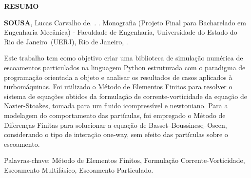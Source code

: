 \begin{center}
\textbf{RESUMO}
\end{center}

%
%

$\!$\\

\hspace{-1.3cm}\textbf{SOUSA}, Lucas Carvalho de. \textit{\mainTitle}. \numPages. Monografia (Projeto Final para Bacharelado em Engenharia Mecânica) - Faculdade de Engenharia, Universidade do Estado do Rio de Janeiro~(UERJ), Rio de Janeiro, \curYear.

\vspace{.2cm}

Este trabalho tem como objetivo criar uma biblioteca de simulação numérica de escoamentos particulados na linguagem Python estruturada com o paradigma de programação orientada a objeto e analisar os resultados de casos aplicados à  turbomáquinas.
Foi utilizado o Método de Elementos Finitos para resolver o sistema de equações obtidos da formulação de corrente-vorticidade da equação de Navier-Stoakes, tomada para um fluido icompressível e newtoniano.
Para a modelagem do comportamento das partículas, foi empregado o Método de Diferenças Finitas para solucionar a equação de Basset–Boussinesq–Oseen, considerando o tipo de interação one-way, sem efeito das partículas sobre o escoamento.

\vspace{1cm}

\hspace{-1.3cm}Palavras-chave: Método de Elementos Finitos, Formulação Corrente-Vorticidade, Escoamento Multifásico, Escoamento Particulado.